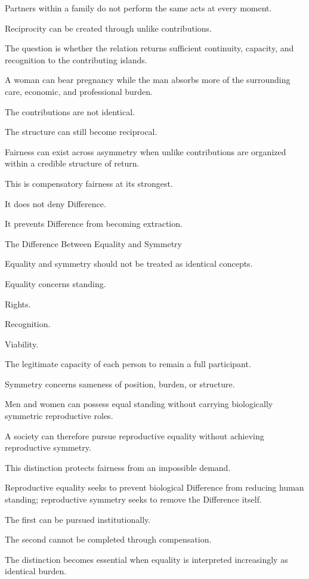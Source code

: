 Partners within a family do not perform the same acts at every moment.

Reciprocity can be created through unlike contributions.

The question is whether the relation returns sufficient continuity, capacity, and recognition to the contributing islands.

A woman can bear pregnancy while the man absorbs more of the surrounding care, economic, and professional burden.

The contributions are not identical.

The structure can still become reciprocal.

Fairness can exist across asymmetry when unlike contributions are organized within a credible structure of return.

This is compensatory fairness at its strongest.

It does not deny Difference.

It prevents Difference from becoming extraction.

The Difference Between Equality and Symmetry

Equality and symmetry should not be treated as identical concepts.

Equality concerns standing.

Rights.

Recognition.

Viability.

The legitimate capacity of each person to remain a full participant.

Symmetry concerns sameness of position, burden, or structure.

Men and women can possess equal standing without carrying biologically symmetric reproductive roles.

A society can therefore pursue reproductive equality without achieving reproductive symmetry.

This distinction protects fairness from an impossible demand.

Reproductive equality seeks to prevent biological Difference from reducing human standing; reproductive symmetry seeks to remove the Difference itself.

The first can be pursued institutionally.

The second cannot be completed through compensation.

The distinction becomes essential when equality is interpreted increasingly as identical burden.

